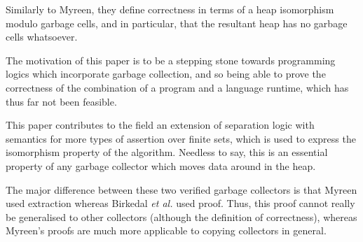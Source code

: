 Similarly to Myreen, they define correctness in terms of a heap
isomorphism modulo garbage cells, and in particular, that the
resultant heap has no garbage cells whatsoever.

The motivation of this paper is to be a stepping stone towards
programming logics which incorporate garbage collection, and so being
able to prove the correctness of the combination of a program and a
language runtime, which has thus far not been feasible.

This paper contributes to the field an extension of separation logic
with semantics for more types of assertion over finite sets, which is
used to express the isomorphism property of the algorithm. Needless to
say, this is an essential property of any garbage collector which
moves data around in the heap.

The major difference between these two verified garbage collectors is
that Myreen used extraction whereas Birkedal \textit{et al.} used
proof. Thus, this proof cannot really be generalised to other
collectors (although the definition of correctness), whereas Myreen's
proofs are much more applicable to copying collectors in general.
